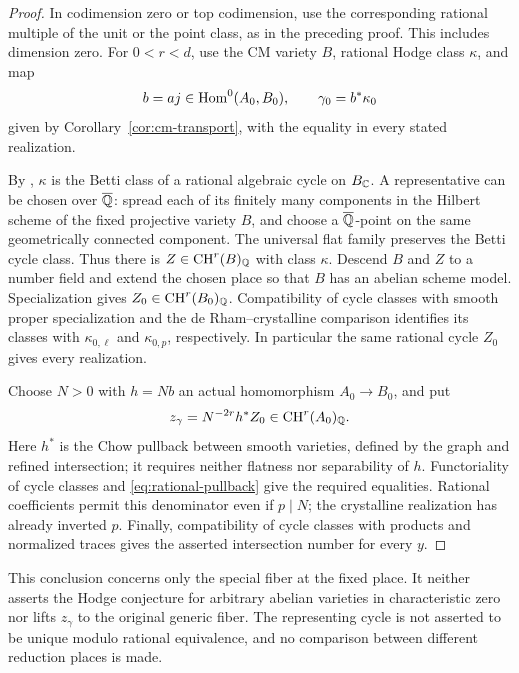 \begin{proof}
In codimension zero or top codimension, use the corresponding rational
multiple of the unit or the point class, as in the preceding proof.
This includes dimension zero.  For $0<r<d$, use the CM variety $B$,
rational Hodge class $\kappa$, and map
\[
 b=aj\in\operatorname{Hom}^0(A_0,B_0),\qquad \gamma_0=b^*\kappa_0
\]
given by Corollary~\ref{cor:cm-transport}, with the equality in every
stated realization.

By \cite[Theorem~1.1]{OpenAICMHodge2026}, \(\kappa\) is the
Betti class of a rational algebraic cycle on \(B_{\mathbb C}\). A
representative can be chosen over \(\overline{\mathbb Q}\): spread each of its
finitely many components in the Hilbert scheme of the fixed projective
variety \(B\), and choose a \(\overline{\mathbb Q}\)-point on the same
geometrically connected component. The universal flat family preserves
the Betti cycle class. Thus there is
\(Z\in\operatorname{CH}^r(B)_{\mathbb Q}\) with class \(\kappa\).
Descend \(B\) and \(Z\) to a number field and extend the chosen
place so that \(B\) has an abelian scheme model. Specialization gives
\(Z_0\in\operatorname{CH}^r(B_0)_{\mathbb Q}\). Compatibility of
cycle classes with smooth proper specialization and the
de Rham--crystalline comparison identifies its classes with
\(\kappa_{0,\ell}\) and \(\kappa_{0,p}\), respectively.
In particular the same rational cycle \(Z_0\) gives every realization.

Choose \(N>0\) with \(h=Nb\) an actual homomorphism
\(A_0\to B_0\), and put
\[
 z_\gamma=N^{-2r}h^*Z_0\in\operatorname{CH}^r(A_0)_{\mathbb Q}.
\]
Here \(h^*\) is the Chow pullback between smooth varieties, defined
by the graph and refined intersection; it requires neither flatness
nor separability of \(h\). Functoriality of cycle classes and
\eqref{eq:rational-pullback} give the required equalities. Rational
coefficients permit this denominator even if \(p\mid N\); the
crystalline realization has already inverted \(p\). Finally,
compatibility of cycle classes with products and normalized traces
gives the asserted intersection number for every \(y\).
\end{proof}

This conclusion concerns only the special fiber at the fixed place.
It neither asserts the Hodge conjecture for arbitrary abelian varieties
in characteristic zero nor lifts \(z_\gamma\) to the original
generic fiber. The representing cycle is not asserted to be unique
modulo rational equivalence, and no comparison between different
reduction places is made.
